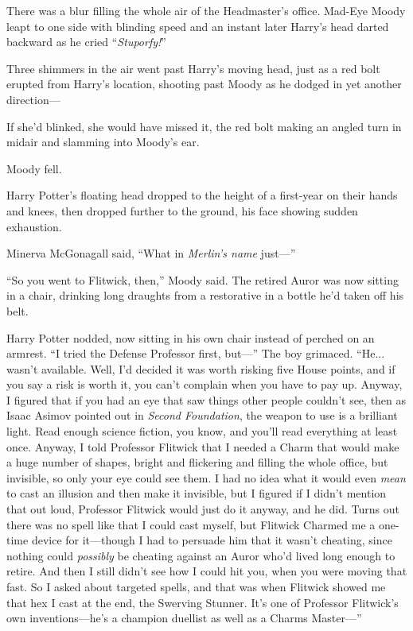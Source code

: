 There was a blur filling the whole air of the Headmaster’s office. Mad-Eye Moody leapt to one side with blinding speed and an instant later Harry’s head darted backward as he cried “\emph{Stuporfy!}”

Three shimmers in the air went past Harry’s moving head, just as a red bolt erupted from Harry’s location, shooting past Moody as he dodged in yet another direction—

If she’d blinked, she would have missed it, the red bolt making an angled turn in midair and slamming into Moody’s ear.

Moody fell.

Harry Potter’s floating head dropped to the height of a first-year on their hands and knees, then dropped further to the ground, his face showing sudden exhaustion.

Minerva McGonagall said, “What in \emph{Merlin’s name} just—”
\sbreak

“So you went to Flitwick, then,” Moody said. The retired Auror was now sitting in a chair, drinking long draughts from a restorative in a bottle he’d taken off his belt.

Harry Potter nodded, now sitting in his own chair instead of perched on an armrest. “I tried the Defense Professor first, but—” The boy grimaced. “He... wasn’t available. Well, I’d decided it was worth risking five House points, and if you say a risk is worth it, you can’t complain when you have to pay up. Anyway, I figured that if you had an eye that saw things other people couldn’t see, then as Isaac Asimov pointed out in \emph{Second Foundation}, the weapon to use is a brilliant light. Read enough science fiction, you know, and you’ll read everything at least once. Anyway, I told Professor Flitwick that I needed a Charm that would make a huge number of shapes, bright and flickering and filling the whole office, but invisible, so only your eye could see them. I had no idea what it would even \emph{mean} to cast an illusion and then make it invisible, but I figured if I didn’t mention that out loud, Professor Flitwick would just do it anyway, and he did. Turns out there was no spell like that I could cast myself, but Flitwick Charmed me a one-time device for it—though I had to persuade him that it wasn’t cheating, since nothing could \emph{possibly} be cheating against an Auror who’d lived long enough to retire. And then I still didn’t see how I could hit you, when you were moving that fast. So I asked about targeted spells, and that was when Flitwick showed me that hex I cast at the end, the Swerving Stunner. It’s one of Professor Flitwick’s own inventions—he’s a champion duellist as well as a Charms Master—”

